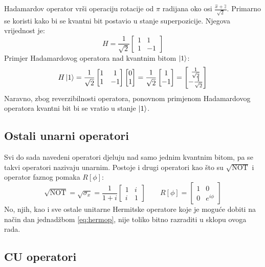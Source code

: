 Hadamardov operator vrši operaciju rotacije od $\pi$ radijana oko osi $\frac{\hat{x} + \hat{z}}{\sqrt{2}}$. Primarno se koristi kako bi se kvantni bit postavio u stanje superpozicije. Njegova vrijednost je:
\[
H = \frac{1}{\sqrt{2}}\begin{bmatrix}
1 & 1 \\ 1 & -1
\end{bmatrix}
\]
Primjer Hadamardovog operatora nad kvantnim bitom $\ket{1}$:
\[
H\ket{1} = \frac{1}{\sqrt{2}}\begin{bmatrix}
1 & 1 \\ 1 & -1
\end{bmatrix}
\begin{bmatrix}
0 \\ 1
\end{bmatrix}
= \frac{1}{\sqrt{2}} \begin{bmatrix} 1 \\ -1
\end{bmatrix}
= \begin{bmatrix}
\frac{1}{\sqrt{2}} \\ -\frac{1}{\sqrt{2}}
\end{bmatrix}
\]
Naravno, zbog reverzibilnosti operatora, ponovnom primjenom Hadamardovog operatora kvantni bit bi se vratio u stanje $\ket{1}$.

\subsection{Ostali unarni operatori}

Svi do sada navedeni operatori djeluju nad samo jednim kvantnim bitom, pa se takvi operatori nazivaju unarnim. Postoje i drugi operatori kao što su $\sqrt{\text{NOT}}$ i operator faznog pomaka $R[\phi]$:
\[
\sqrt{\text{NOT}} = \sqrt{\sigma_x} = \frac{1}{1+i}\begin{bmatrix}
1 & i \\ i & 1
\end{bmatrix}
\qquad
R[\phi] = \begin{bmatrix}
1 & 0 \\ 0 & e^{i\phi}
\end{bmatrix}
\]
No, njih, kao i sve ostale unitarne Hermitske operatore koje je moguće dobiti na način dan jednadžbom \ref{eq:hermop}, nije toliko bitno razraditi u sklopu ovoga rada.

\subsection{CU operatori}

